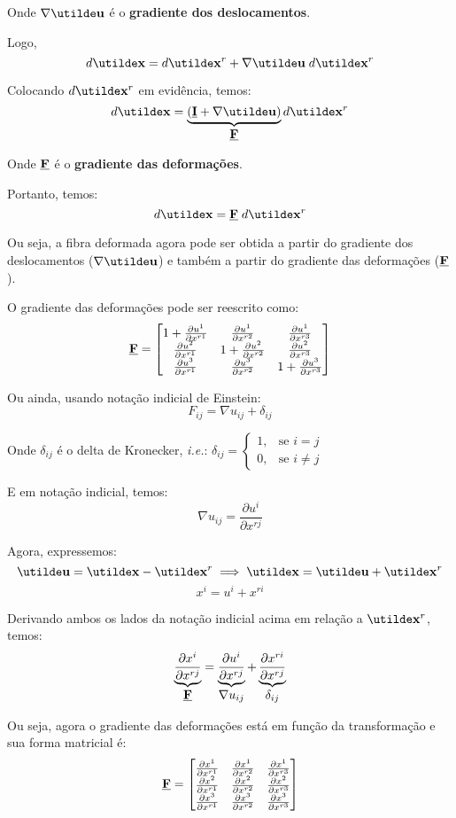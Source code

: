 Onde $\nabla\vt{u}$ é o \textbf{gradiente dos deslocamentos}.

Logo,
\[d\vt{x}=d\vt{x}^r+\nabla\vt{u}\;d\vt{x}^r\]

Colocando $d\vt{x}^r$ em evidência, temos:
\[d\vt{x}=\underbrace{(\ts{I}+\nabla\vt{u})}_{\displaystyle \ts{F}}d\vt{x}^r\]

Onde $\underline{\mathbf{F}}$ é o \textbf{gradiente das deformações}.

Portanto, temos:
\begin{equation}
	d\vt{x}=\ts{F}\;d\vt{x}^r
\end{equation}

Ou seja, a fibra deformada agora pode ser obtida a partir do gradiente dos deslocamentos ($\nabla\vt{u}$) e também a partir do gradiente das deformações ($\underline{\mathbf{F}}$).

O gradiente das deformações pode ser reescrito como:
\[
	\underline{\mathbf{F}}=
	\begin{bmatrix}
		1+\frac{\partial u^1}{\partial x^{r1}} & \frac{\partial u^1}{\partial x^{r2}} & \frac{\partial u^1}{\partial x^{r3}} \\
		\frac{\partial u^2}{\partial x^{r1}} & 1+\frac{\partial u^2}{\partial x^{r2}} & \frac{\partial u^2}{\partial x^{r3}} \\
		\frac{\partial u^3}{\partial x^{r1}} & \frac{\partial u^3}{\partial x^{r2}} & 1+\frac{\partial u^3}{\partial x^{r3}}
	\end{bmatrix}
\]

Ou ainda, usando notação indicial de Einstein:
\[F_{ij}=\nabla u_{ij}+\delta_{ij}\]

Onde $\delta_{ij}$ é o delta de Kronecker, \textit{i.e.}: $\delta_{ij}=\begin{cases} 1, & \text{se } i=j \\ 0, & \text{se } i\neq j \end{cases}$

E em notação indicial, temos:
\[\nabla u_{ij}=\frac{\partial u^i}{\partial x^{rj}}\]

Agora, expressemos:
\[\vt{u}=\vt{x}-\vt{x}^r\implies \vt{x}=\vt{u}+\vt{x}^r\]
\[x^i=u^i+x^{ri}\]

Derivando ambos os lados da notação indicial acima em relação a $\vt{x}^r$, temos:
\[\underbrace{\frac{\partial x^i}{\partial x^{rj}}}_{\displaystyle\underline{\mathbf{F}}}=\underbrace{\frac{\partial u^i}{\partial x^{rj}}}_{\displaystyle\nabla u_{ij}}+\underbrace{\frac{\partial x^{ri}}{\partial x^{rj}}}_{\displaystyle\delta_{ij}}\]

Ou seja, agora o gradiente das deformações está em função da transformação e sua forma matricial é:
\[
	\underline{\mathbf{F}}=
	\begin{bmatrix}
		\frac{\partial x^1}{\partial x^{r1}} & \frac{\partial x^1}{\partial x^{r2}} & \frac{\partial x^1}{\partial x^{r3}} \\
		\frac{\partial x^2}{\partial x^{r1}} & \frac{\partial x^2}{\partial x^{r2}} & \frac{\partial x^2}{\partial x^{r3}} \\
		\frac{\partial x^3}{\partial x^{r1}} & \frac{\partial x^3}{\partial x^{r2}} & \frac{\partial x^3}{\partial x^{r3}}
	\end{bmatrix}
\]

